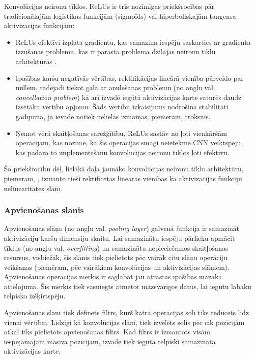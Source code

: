 Konvolūcijas neironu tīklos, ReLUs ir trīs nozīmīgas priekšrocības pār tradicionālajām loģistikas funkcijām (sigmoīds) vai hiperboliskajām tangensa aktivizācijas funkcijām:
\begin{itemize}
	\item ReLUs efektīvi izplata gradientu, kas samazina iespēju saskarties ar gradienta izzušanas problēmu, kas ir parasta problēma dziļajās neironu tīklu arhitektūrās \cite{hochreiter1998vanishing}.
	\item Īpašības karšu negatīvās vērtības, rektifikācijas lineārā vienība pārveido par nullēm, tādējādi tiekot galā ar anulēšanas problēmu (no angļu val. \textit{cancellation problem}) kā arī izvadē iegūtā aktivizācijas karte saturēs daudz izsētāku vērtību apjomu. Šāds vērtību izkaisījums nodrošina stabilitāti gadījumā, ja ievadē notiek nelielas izmaiņas, piemēram, troksnis\cite{glorot2011deep}. 
	\item Ņemot vērā skaitļošanas sarežģītību, ReLUs sastāv no ļoti vienkāršām operācijām, kas nozīmē, ka šīs operācijas smagi neietekmē CNN veiktspēju, kas padara to implementēšanu konvolūcijas neironu tīklos ļoti efektīvu.
\end{itemize}
Šo priekšrocību dēļ, lielākā daļa jaunāko konvolūcijas neironu tīklu arhitektūru, piemēram, \cite{krizhevsky2012imagenet}\cite{DBLP:journals/corr/HeZR015}\cite{simonyan2014very}, izmanto tieši rektificētās lineārās vienības kā aktivizācijas funkciju nelinearitātes slānī.
\subsubsection{Apvienošanas slānis}
Apvienošanas slāņa (no angļu val. \textit{pooling layer}) galvenā funkcija ir samazināt aktivizāciju karšu dimensiju skaitu. Lai samazinātu iespēju pārlieku apmācīt tīklus (no angļu val. \textit{overfitting}) un samazinātu nepieciešamos skaitļošanas resursus, visbiežāk, šis slānis tiek pielietots pēc vairāk citu slāņu operāciju veikšanas (piemēram, pēc vairākiem konvolūcijas un aktivizācijas slāņiem). Apvienošanas operācijas mērķis ir saglabāt jau atrastās īpašības mazākā attēlojumā. Šis mērķis tiek sasniegts atmetot mazsvarīgos datus, lai iegūtu labāku telpisko izšķirtspēju. 

Apvienošanas slānī tiek definēts filtrs, kurš katrā operācijas solī tiks reducēts līdz vienai vērtībai. Līdzīgi kā konvolūcijas slānī, tiek izvēlēts solis pēc cik pozīcijām atkal tiks pielietots apvienošanas filtrs. Kad filtrs ir izmantots visām iespējamajām masīva pozīcijām, izvadē tiek iegūta telpiski samazināta aktivizācijas karte.

